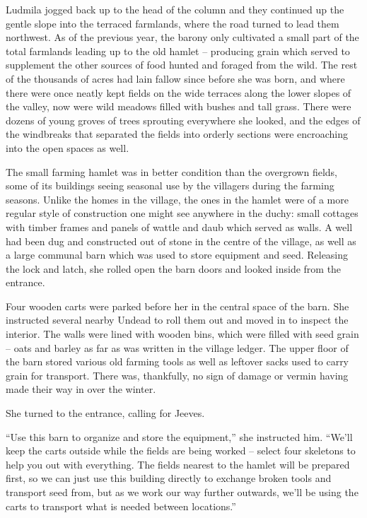  

Ludmila jogged back up to the head of the column and they continued up the gentle slope into the terraced farmlands, where the road turned to lead them northwest. As of the previous year, the barony only cultivated a small part of the total farmlands leading up to the old hamlet – producing grain which served to supplement the other sources of food hunted and foraged from the wild. The rest of the thousands of acres had lain fallow since before she was born, and where there were once neatly kept fields on the wide terraces along the lower slopes of the valley, now were wild meadows filled with bushes and tall grass. There were dozens of young groves of trees sprouting everywhere she looked, and the edges of the windbreaks that separated the fields into orderly sections were encroaching into the open spaces as well.

 

The small farming hamlet was in better condition than the overgrown fields, some of its buildings seeing seasonal use by the villagers during the farming seasons. Unlike the homes in the village, the ones in the hamlet were of a more regular style of construction one might see anywhere in the duchy: small cottages with timber frames and panels of wattle and daub which served as walls. A well had been dug and constructed out of stone in the centre of the village, as well as a large communal barn which was used to store equipment and seed. Releasing the lock and latch, she rolled open the barn doors and looked inside from the entrance.

 

Four wooden carts were parked before her in the central space of the barn. She instructed several nearby Undead to roll them out and moved in to inspect the interior. The walls were lined with wooden bins, which were filled with seed grain – oats and barley as far as was written in the village ledger. The upper floor of the barn stored various old farming tools as well as leftover sacks used to carry grain for transport. There was, thankfully, no sign of damage or vermin having made their way in over the winter.

 

She turned to the entrance, calling for Jeeves.

 

“Use this barn to organize and store the equipment,” she instructed him. “We’ll keep the carts outside while the fields are being worked – select four skeletons to help you out with everything. The fields nearest to the hamlet will be prepared first, so we can just use this building directly to exchange broken tools and transport seed from, but as we work our way further outwards, we’ll be using the carts to transport what is needed between locations.”

